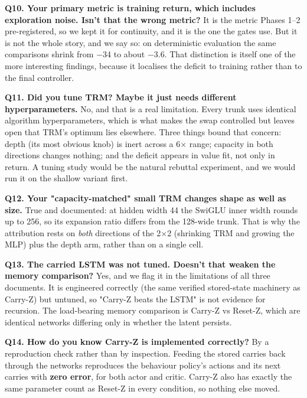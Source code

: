 \documentclass[11pt]{article}
\begin{document}
\textbf{Q10. Your primary metric is training return, which includes exploration noise. Isn't that the wrong metric?} It is the metric Phases 1--2 pre-registered, so we kept it for continuity, and it is the one the gates use. But it is not the whole story, and we say so: on deterministic evaluation the same comparisons shrink from $-$34 to about $-$3.6. That distinction is itself one of the more interesting findings, because it localises the deficit to training rather than to the final controller.



\textbf{Q11. Did you tune TRM? Maybe it just needs different hyperparameters.} No, and that is a real limitation. Every trunk uses identical algorithm hyperparameters, which is what makes the swap controlled but leaves open that TRM's optimum lies elsewhere. Three things bound that concern: depth (its most obvious knob) is inert across a 6$\times$ range; capacity in both directions changes nothing; and the deficit appears in value fit, not only in return. A tuning study would be the natural rebuttal experiment, and we would run it on the shallow variant first.



\textbf{Q12. Your "capacity-matched" small TRM changes shape as well as size.} True and documented: at hidden width 44 the SwiGLU inner width rounds up to 256, so its expansion ratio differs from the 128-wide trunk. That is why the attribution rests on \emph{both} directions of the 2$\times$2 (shrinking TRM and growing the MLP) plus the depth arm, rather than on a single cell.



\textbf{Q13. The carried LSTM was not tuned. Doesn't that weaken the memory comparison?} Yes, and we flag it in the limitations of all three documents. It is engineered correctly (the same verified stored-state machinery as Carry-Z) but untuned, so "Carry-Z beats the LSTM" is not evidence for recursion. The load-bearing memory comparison is Carry-Z vs Reset-Z, which are identical networks differing only in whether the latent persists.



\textbf{Q14. How do you know Carry-Z is implemented correctly?} By a reproduction check rather than by inspection. Feeding the stored carries back through the networks reproduces the behaviour policy's actions and its next carries with \textbf{zero error}, for both actor and critic. Carry-Z also has exactly the same parameter count as Reset-Z in every condition, so nothing else moved.
\end{document}
